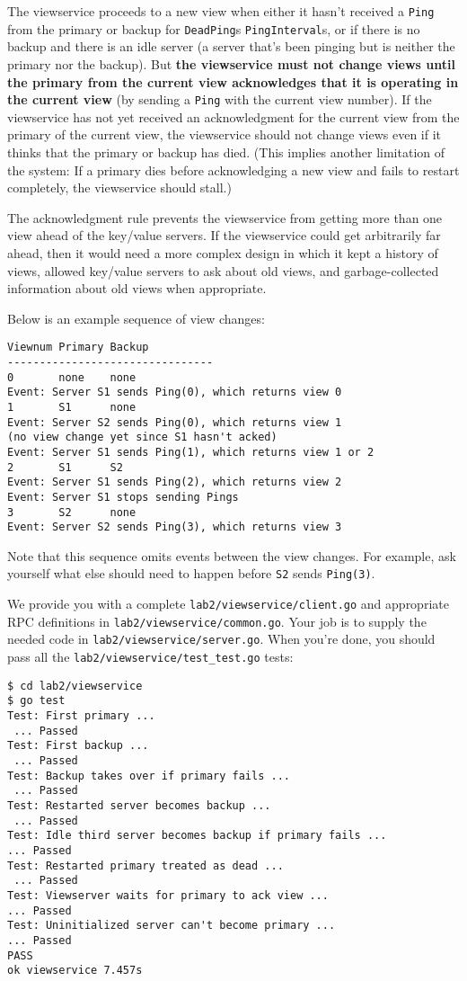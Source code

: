 \documentclass{article}
\newcommand{\code}{\texttt}
\begin{document}
The viewservice proceeds to a new view when either it hasn't received a \code{Ping} from the primary or backup for \code{DeadPing}s \code{PingInterval}s, or if there is no backup and there is an idle server (a server that's been pinging but is neither the primary nor the backup). But \textbf{the viewservice must not change views until the primary from the current view acknowledges that it is operating in the current view} (by sending a \code{Ping} with the current view number). If the viewservice has not yet received an acknowledgment for the current view from the primary of the current view, the viewservice should not change views even if it thinks that the primary or backup has died. (This implies another limitation of the system: If a primary dies before acknowledging a new view and fails to restart completely, the viewservice should stall.)

The acknowledgment rule prevents the viewservice from getting more than one view ahead of the key/value servers. If the viewservice could get arbitrarily far ahead, then it would need a more complex design in which it kept a history of views, allowed key/value servers to ask about old views, and garbage-collected information about old views when appropriate. 

Below is an example sequence of view changes:
\begin{lstlisting}
Viewnum Primary Backup
-------------------------------- 
0       none    none 
Event: Server S1 sends Ping(0), which returns view 0 
1       S1      none 
Event: Server S2 sends Ping(0), which returns view 1 
(no view change yet since S1 hasn't acked) 
Event: Server S1 sends Ping(1), which returns view 1 or 2 
2       S1      S2 
Event: Server S1 sends Ping(2), which returns view 2 
Event: Server S1 stops sending Pings
3       S2      none 
Event: Server S2 sends Ping(3), which returns view 3
\end{lstlisting}

Note that this sequence omits events between the view changes. For example, ask yourself what else should need to happen before \code{S2} sends \code{Ping(3)}.

We provide you with a complete \code{lab2/viewservice/client.go} and appropriate RPC definitions in \code{lab2/viewservice/common.go}. Your job is to supply the needed code in \code{lab2/viewservice/server.go}. 
When you're done, you should pass all the \code{lab2/viewservice/test\_test.go} tests:

\begin{lstlisting}
$ cd lab2/viewservice
$ go test 
Test: First primary ... 
 ... Passed 
Test: First backup ... 
 ... Passed 
Test: Backup takes over if primary fails ... 
 ... Passed 
Test: Restarted server becomes backup ... 
 ... Passed 
Test: Idle third server becomes backup if primary fails ...
... Passed 
Test: Restarted primary treated as dead ... 
 ... Passed 
Test: Viewserver waits for primary to ack view ...
... Passed 
Test: Uninitialized server can't become primary ...
... Passed 
PASS 
ok viewservice 7.457s 
\end{lstlisting}
\end{document}
